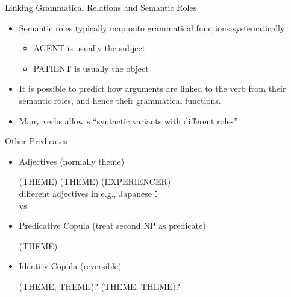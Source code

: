 \begin{frame}{Linking Grammatical Relations and Semantic Roles}
\begin{itemize}
\item    Semantic roles typically map onto grammatical 
  functions systematically
  \begin{itemize}
  \item  AGENT is usually the subject
  \item  PATIENT is usually the object
  \end{itemize}
\item  It is possible to predict how arguments are linked to 
the verb from their semantic roles, and hence their 
grammatical functions.

\item Many verbs allow s ``syntactic variants with different roles''

\begin{exe}
  \ex {}  
  \ex {}  
  \ex {}  
\end{exe}
\end{itemize}

\end{frame}

\begin{frame}{Other Predicates}

\begin{itemize}
\item Adjectives  (normally theme)
  \begin{exe}
  \ex {} (THEME)
  \ex {} (THEME)
  \ex {} (EXPERIENCER)
    \\ different adjectives in e.g., Japanese：
    \\     vs  
  \end{exe}
\item Predicative Copula (treat second NP as predicate)
  \begin{exe}
  \ex {} (THEME)
  \end{exe}
\item Identity Copula (reversible)
  \begin{exe}
  \ex {} (THEME, THEME)?
  \ex {} (THEME, THEME)?
  \end{exe}


\end{itemize}



\end{frame}

